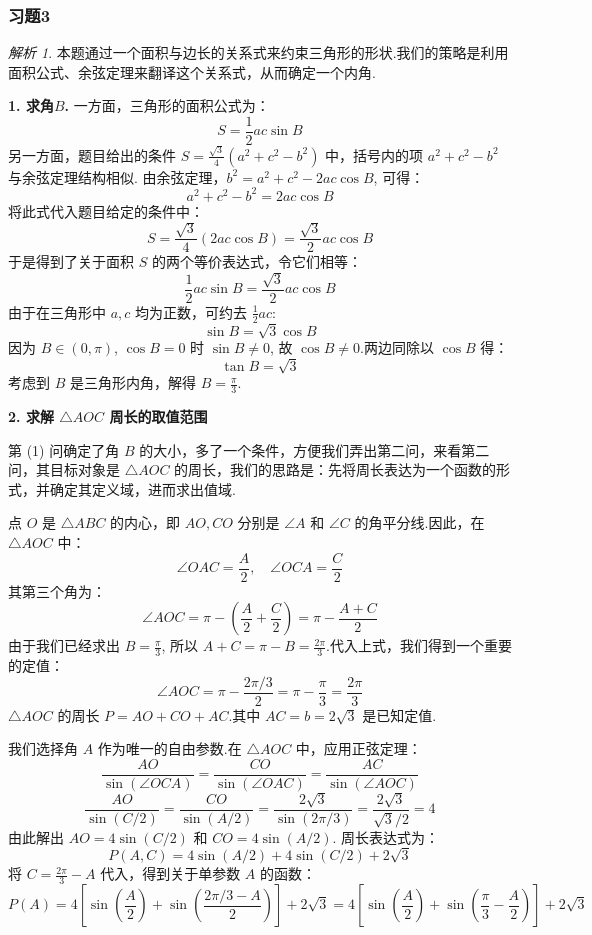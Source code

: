 \documentclass[12pt,a4paper]{ctexbook}
\theoremstyle{definition}
\theoremstyle{remark}
\newtheorem*{solution}{解析}
\begin{document}
	\subsubsection{习题3}
	\begin{solution}
		本题通过一个面积与边长的关系式来约束三角形的形状.我们的策略是利用面积公式、余弦定理来翻译这个关系式，从而确定一个内角.
		
		\textbf{1. 求角$B$.}
		一方面，三角形的面积公式为：
		\[
		S = \frac{1}{2}ac\sin B
		\]
		另一方面，题目给出的条件 $S = \frac{\sqrt{3}}{4}(a^2+c^2-b^2)$ 中，括号内的项 $a^2+c^2-b^2$ 与余弦定理结构相似.
		由余弦定理，$b^2 = a^2+c^2 - 2ac\cos B$, 可得：
		\[
		a^2+c^2-b^2 = 2ac\cos B
		\]
		将此式代入题目给定的条件中：
		\[
		S = \frac{\sqrt{3}}{4}(2ac\cos B) = \frac{\sqrt{3}}{2}ac\cos B
		\]
		于是得到了关于面积 $S$ 的两个等价表达式，令它们相等：
		\[
		\frac{1}{2}ac\sin B = \frac{\sqrt{3}}{2}ac\cos B
		\]
		由于在三角形中 $a, c$ 均为正数，可约去 $\frac{1}{2}ac$:
		\[
		\sin B = \sqrt{3}\cos B
		\]
		因为 $B \in (0, \pi)$, $\cos B=0$ 时 $\sin B \neq 0$, 故 $\cos B \neq 0$.两边同除以 $\cos B$ 得：
		\[
		\tan B = \sqrt{3}
		\]
		考虑到 $B$ 是三角形内角，解得 $B = \frac{\pi}{3}$.
		
		\textbf{2. 求解 $\triangle AOC$ 周长的取值范围}
		
		第 (1) 问确定了角 $B$ 的大小，多了一个条件，方便我们弄出第二问，来看第二问，其目标对象是 $\triangle AOC$ 的周长，我们的思路是：先将周长表达为一个函数的形式，并确定其定义域，进而求出值域.
		
		点 $O$ 是 $\triangle ABC$ 的内心，即 $AO, CO$ 分别是 $\angle A$ 和 $\angle C$ 的角平分线.因此，在 $\triangle AOC$ 中：
		\[
		\angle OAC = \frac{A}{2}, \quad \angle OCA = \frac{C}{2}
		\]
		其第三个角为：
		\[
		\angle AOC = \pi - \left(\frac{A}{2} + \frac{C}{2}\right) = \pi - \frac{A+C}{2}
		\]
		由于我们已经求出 $B=\frac{\pi}{3}$, 所以 $A+C = \pi - B = \frac{2\pi}{3}$.代入上式，我们得到一个重要的定值：
		\[
		\angle AOC = \pi - \frac{2\pi/3}{2} = \pi - \frac{\pi}{3} = \frac{2\pi}{3}
		\]
		$\triangle AOC$ 的周长 $P = AO + CO + AC$.其中 $AC = b = 2\sqrt{3}$ 是已知定值.
		
		我们选择角 $A$ 作为唯一的自由参数.在 $\triangle AOC$ 中，应用正弦定理：
		\[
		\frac{AO}{\sin(\angle OCA)} = \frac{CO}{\sin(\angle OAC)} = \frac{AC}{\sin(\angle AOC)}
		\]
		\[
		\frac{AO}{\sin(C/2)} = \frac{CO}{\sin(A/2)} = \frac{2\sqrt{3}}{\sin(2\pi/3)} = \frac{2\sqrt{3}}{\sqrt{3}/2} = 4
		\]
		由此解出 $AO = 4\sin(C/2)$ 和 $CO = 4\sin(A/2)$.
		周长表达式为：
		\[
		P(A,C) = 4\sin(A/2) + 4\sin(C/2) + 2\sqrt{3}
		\]
		将 $C = \frac{2\pi}{3}-A$ 代入，得到关于单参数 $A$ 的函数：
		\[
		P(A) = 4\left[\sin\left(\frac{A}{2}\right) + \sin\left(\frac{2\pi/3-A}{2}\right)\right] + 2\sqrt{3} = 4\left[\sin\left(\frac{A}{2}\right) + \sin\left(\frac{\pi}{3}-\frac{A}{2}\right)\right] + 2\sqrt{3}
		\]
		

\end{solution}
\end{document}
